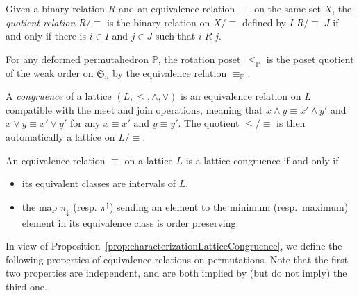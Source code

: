 \documentclass[AHL,Unicode,longabstracts,published]{cedram}
\newcommand{\f}[1]{\mathfrak{#1}}
\newcommand{\meet}{\wedge}
\newcommand{\join}{\vee}
\newcommand{\projDown}{\pi_\downarrow}
\newcommand{\projUp}{\pi^\uparrow}
\newcommand{\polytope}[1]{\mathds{#1}}
\begin{document}
\begin{defi}\label{def:quotientRelation}
Given a binary relation $R$ and an equivalence relation $\equiv$ on the same set $X$, the
\emph{quotient relation} $R/{\equiv}$ is the binary relation on $X/{\equiv}$ defined by $I \; R/{\equiv} \; J$ if and only if there is $i \in I$ and $j \in J$ such that $i \; R \; j$.
\end{defi}

\begin{prop}\label{prop:rotationPoset}
For any deformed permutahedron $\polytope{P}$, the rotation poset~$\le_\polytope{P}$ is the poset quotient of the weak order on $\f{S}_n$ by the equivalence relation $\equiv_\polytope{P}$.
\end{prop}

\begin{defi}\label{def:latticeCongruence}
A
\emph{congruence} of a lattice $(L, \le, \meet, \join)$ is an equivalence relation on $L$ compatible with the meet and join operations, meaning that ${x \meet y \equiv x' \meet y'}$ and $x \join y \equiv x' \join y'$ for any $x \equiv x'$ and $y \equiv y'$. The quotient $\le/{\equiv}$ is then automatically a lattice on $L/{\equiv}$.
\end{defi}

\begin{prop}\label{prop:characterizationLatticeCongruence}
An equivalence relation $\equiv$ on a lattice $L$ is a lattice congruence if and only if
\begin{itemize}
\item its equivalent classes are intervals of $L$,
\item the map $\projDown$ (resp. $\projUp$) sending an element to the minimum (resp.~maximum) element in its equivalence class is order preserving.
\end{itemize}
\end{prop}

In view of Proposition~\ref{prop:characterizationLatticeCongruence}, we define the following properties of equivalence relations on permutations. Note that the first two properties are independent, and are both implied by (but do not imply) the third one.
\end{document}
